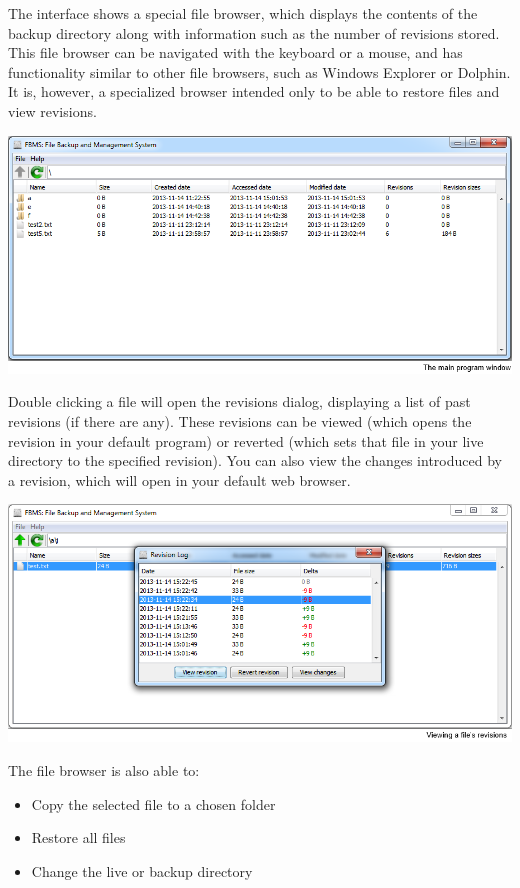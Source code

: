 \documentclass[12pt,a4paper]{article}
\begin{document}
The interface shows a special file browser, which displays the contents of the backup directory along with information such as the number of revisions stored. This file browser can be navigated with the keyboard or a mouse, and has functionality similar to other file browsers, such as Windows Explorer or Dolphin. It is, however, a specialized browser intended only to be able to restore files and view revisions.

\includegraphics[width=\textwidth]{images/5-mainWindow.png}

Double clicking a file will open the revisions dialog, displaying a list of past revisions (if there are any). These revisions can be viewed (which opens the revision in your default program) or reverted (which sets that file in your live directory to the specified revision). You can also view the changes introduced by a revision, which will open in your default web browser.

\includegraphics[width=\textwidth]{images/6-revisionDialog.png}

The file browser is also able to:

\begin{itemize}
\item Copy the selected file to a chosen folder
\item Restore all files
\item Change the live or backup directory
\end{itemize}
\end{document}
